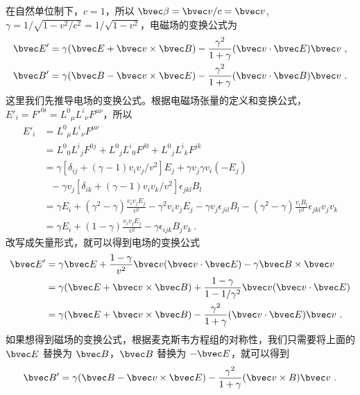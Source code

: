在自然单位制下，$c=1$，所以 $\bvec \beta=\bvec v/c=\bvec v$,$\gamma=1/\sqrt{1-v^2/c^2}=1/\sqrt{1-v^2}$，电磁场的变换公式为
\begin{equation}
\begin{aligned}
\bvec E'=\gamma(\bvec E+\bvec v\times \bvec B)-\frac{\gamma^2}{1+\gamma}(\bvec v \cdot \bvec E)\bvec v~,\\
\bvec B'=\gamma(\bvec B-\bvec v\times \bvec E)-\frac{\gamma^2}{1+\gamma}(\bvec v \cdot \bvec B)\bvec v~.
\end{aligned}
\end{equation}
这里我们先推导电场的变换公式。根据电磁场张量的定义和变换公式， $E'_i=F'^{0i}={L^0}_\mu {L^i}_{\nu} F^{\mu\nu}$，所以
\begin{equation}
\begin{aligned}
E'_i&={L^0}_\mu {L^i}_\nu F^{\mu\nu}\\
&={L^0}_0 {L^i}_j F^{0j}+{L^0}_j {L^i}_0 F^{j0} + {L^0}_j {L^i}_k F^{jk} \\
&=\gamma[\delta_{ij}+(\gamma-1) v_iv_j/v^2]E_j+\gamma v_j\gamma v_i  (-E_j)\\
&\ \ \ -\gamma v_j [\delta_{ik}+(\gamma-1)v_i v_k/v^2]\epsilon_{jkl}B_l\\
&=\gamma E_i+(\gamma^2-\gamma)\frac{v_iv_jE_j}{v^2}-\gamma^2v_iv_jE_j-\gamma v_j\epsilon_{jil}B_l -(\gamma^2-\gamma)\frac{v_iB_l}{v^2}\epsilon_{jkl}v_jv_k \\
&=\gamma E_i+(1-\gamma)\frac{v_iv_jE_j}{v^2}-\gamma\epsilon_{ijk}B_jv_k~.
\end{aligned}
\end{equation}
改写成矢量形式，就可以得到电场的变换公式
\begin{equation}
\begin{aligned}
\bvec E'&=\gamma\bvec E+\frac{1-\gamma}{v^2}\bvec v(\bvec v\cdot \bvec E)-\gamma \bvec B\times \bvec v\\
&=\gamma(\bvec E+\bvec v\times \bvec B)+\frac{1-\gamma}{1-1/\gamma^2}\bvec v(\bvec v \cdot \bvec E)\\
&=\gamma(\bvec E+\bvec v\times \bvec B)-\frac{\gamma^2}{1+\gamma}(\bvec v\cdot \bvec E)\bvec v~.
\end{aligned} 
\end{equation}
如果想得到磁场的变换公式，根据麦克斯韦方程组的对称性，我们只需要将上面的 $\bvec E$ 替换为 $\bvec B$，$\bvec B$ 替换为 $-\bvec E$，就可以得到
\begin{equation}
\bvec B'=\gamma (\bvec B-\bvec v\times \bvec E)-\frac{\gamma^2}{1+\gamma}(\bvec v\times B)\bvec v~.
\end{equation}
